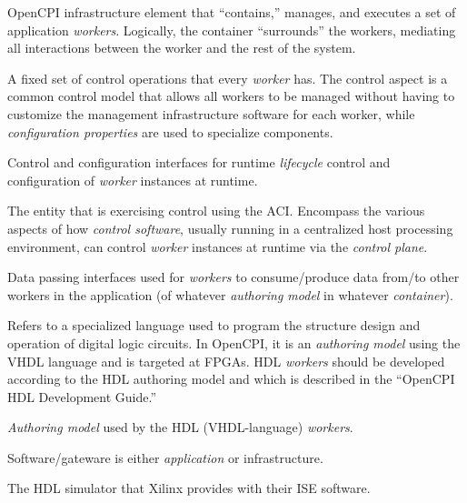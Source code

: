 \begin{description}[style=nextline]
\item[Containers]
OpenCPI infrastructure element that ``contains,'' manages, and executes a set of application \textit{workers}. Logically, the container ``surrounds'' the workers, mediating all interactions between the worker and the rest of the system.

\item[Control Operations]
A fixed set of control operations that every \textit{worker} has. The control aspect is a common control model that allows all workers to be managed without having to customize the management infrastructure software for each worker, while \textit{configuration properties} are used to specialize components.

\item[Control Plane]
Control and configuration interfaces for runtime \textit{lifecycle} control and configuration of \textit{worker} instances at runtime.

\item[Control Software (AKA Control Application AKA Control Agent)]
The entity that is exercising control using the ACI. Encompass the various aspects of how \textit{control software}, usually running in a centralized host processing environment, can control \textit{worker} instances at runtime via the \textit{control plane}.

\item[Data Plane]
Data passing interfaces used for \textit{workers} to consume/produce data from/to other workers in the application (of whatever \textit{authoring model} in whatever \textit{container}).

\item[Hardware Description Language]
Refers to a specialized language used to program the structure design and operation of digital logic circuits. In OpenCPI, it is an \textit{authoring model} using the VHDL language and is targeted at FPGAs. HDL \textit{workers} should be developed according to the HDL authoring model and which is described in the ``OpenCPI HDL Development Guide.''

\item[HDL Authoring Model]
\textit{Authoring model} used by the HDL (VHDL-language) \textit{workers}.

\item[Infrastructure]
Software/gateware is either \textit{application} or infrastructure.

\item[isim]
The HDL simulator that Xilinx provides with their ISE software.


\end{description}
